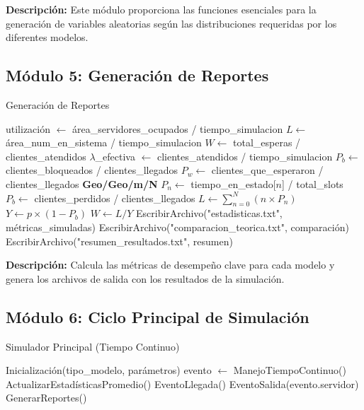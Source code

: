 \documentclass{article}
\begin{document}
\textbf{Descripción:} Este módulo proporciona las funciones esenciales para la generación de variables aleatorias según las distribuciones requeridas por los diferentes modelos.

\subsection{Módulo 5: Generación de Reportes}

\begin{algorithm}[H]
\caption{Generación de Reportes}
\begin{algorithmic}[1]
    \STATE utilización $\gets$ área\_servidores\_ocupados / tiempo\_simulacion
    \STATE $L \gets$ área\_num\_en\_sistema / tiempo\_simulacion
    \STATE $W \gets$ total\_esperas / clientes\_atendidos
    \STATE $\lambda$\_efectiva $\gets$ clientes\_atendidos / tiempo\_simulacion
        \STATE $P_b \gets$ clientes\_bloqueados / clientes\_llegados
        \STATE $P_w \gets$ clientes\_que\_esperaron / clientes\_llegados
    \ENDIF
\ELSE
    \STATE \textbf{Geo/Geo/m/N}
        \STATE $P_n \gets$ tiempo\_en\_estado[$n$] / total\_slots
    \ENDFOR
    \STATE $P_b \gets$ clientes\_perdidos / clientes\_llegados
    \STATE $L \gets \sum_{n=0}^N (n \times P_n)$
    \STATE $Y \gets p \times (1 - P_b)$ 
    \STATE $W \gets L / Y$ 
\ENDIF
\STATE EscribirArchivo("estadisticas.txt", métricas\_simuladas)
\STATE EscribirArchivo("comparacion\_teorica.txt", comparación)
\STATE EscribirArchivo("resumen\_resultados.txt", resumen)
\end{algorithmic}
\end{algorithm}

\textbf{Descripción:} Calcula las métricas de desempeño clave para cada modelo y genera los archivos de salida con los resultados de la simulación.

\subsection{Módulo 6: Ciclo Principal de Simulación}

\begin{algorithm}[H]
\caption{Simulador Principal (Tiempo Continuo)}
\begin{algorithmic}[1]
\STATE Inicialización(tipo\_modelo, parámetros)
    \STATE evento $\gets$ ManejoTiempoContinuo()
    \STATE ActualizarEstadísticasPromedio()
        \STATE EventoLlegada()
    \ELSE
        \STATE EventoSalida(evento.servidor)
    \ENDIF
\ENDWHILE
\STATE GenerarReportes()
\end{algorithmic}
\end{algorithm}
\end{document}
